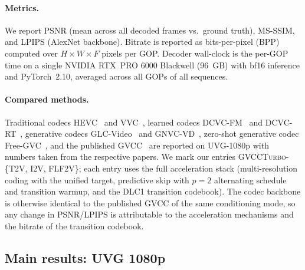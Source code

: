 \paragraph{Metrics.}
We report PSNR (mean across all decoded frames vs.\ ground truth),
MS-SSIM, and LPIPS (AlexNet backbone). Bitrate is reported as
bits-per-pixel (BPP) computed over $H\times W \times F$ pixels per GOP.
Decoder wall-clock is the per-GOP time on a single NVIDIA RTX~PRO 6000
Blackwell (96~GB) with bf16 inference and PyTorch~2.10, averaged across
all GOPs of all sequences.

\paragraph{Compared methods.}
Traditional codecs HEVC~\cite{sullivan2012overview} and
VVC~\cite{bross2021overview}, learned codecs DCVC-FM~\cite{li2024neural}
and DCVC-RT~\cite{jia2025dcvcrt}, generative codecs
GLC-Video~\cite{qi2025generative} and GNVC-VD~\cite{mao2025gnvcvd},
zero-shot generative codec Free-GVC~\cite{ling2026freegvc}, and the
published GVCC~\cite{zeng2026gvcc} are reported on UVG-1080p with
numbers taken from the respective papers. We mark our entries
\textsc{GVCCTurbo}-\{T2V, I2V, FLF2V\}; each entry uses the full
acceleration stack (multi-resolution coding with the unified target,
predictive skip with $p\!=\!2$ alternating schedule and transition
warmup, and the DLC1 transition codebook). The codec backbone is
otherwise identical to the published GVCC of the same conditioning mode,
so any change in PSNR/LPIPS is attributable to the acceleration mechanisms
and the bitrate of the transition codebook.

\subsection{Main results: UVG 1080p}
\label{sec:exp-main}

